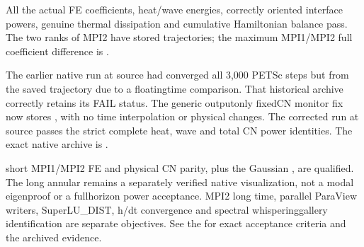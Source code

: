 \documentclass[letterpaper,10pt,english]{sphinxmanual}
\begin{document}
\sphinxAtStartPar
All the actual FE coefficients,
heat/wave energies, correctly oriented
interface powers, genuine thermal
dissipation and cumulative Hamiltonian
balance pass. The two ranks of MPI2
have  stored
trajectories; the maximum MPI1/MPI2
full coefficient difference is
.

\sphinxAtStartPar
The earlier native run at source
 had converged all
3,000 PETSc steps but  from the saved
trajectory due to a floating\sphinxhyphen{}time
comparison. That historical archive
correctly retains its FAIL status.
The generic output\sphinxhyphen{}only fixed\sphinxhyphen{}CN
monitor fix now stores , with no
time interpolation or physical changes.
The corrected run at source
 passes the strict
complete  heat,
wave and total CN power identities.
The exact native archive is
.

\sphinxAtStartPar
{} short MPI1/MPI2 FE and
physical CN parity, plus the Gaussian
, are qualified.
The long annular 
remains a separately verified native
visualization, not a modal eigenproof
or a full\sphinxhyphen{}horizon power acceptance.
MPI2 long time, parallel ParaView
writers, SuperLU\_DIST, h/dt convergence
and spectral whispering\sphinxhyphen{}gallery
identification are separate objectives.
See the
for exact acceptance criteria and
the archived evidence.
\end{document}
